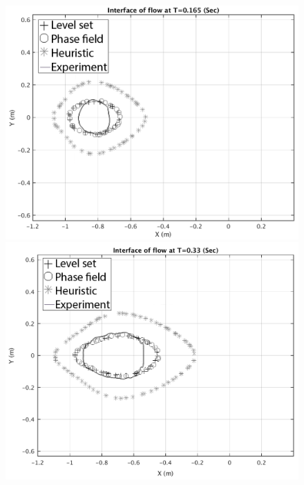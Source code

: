 \documentclass[review]{elsarticle}
\begin{document}
\begin{figure}[H]
        \begin{minipage}[b]{.5\textwidth}
                \centering                
                \includegraphics[width=1\textwidth]{IMAGES/interface165.png}                
                \includegraphics[width=1\textwidth]{IMAGES/interface330.png}
              

\end{minipage}
\end{figure}
\end{document}
